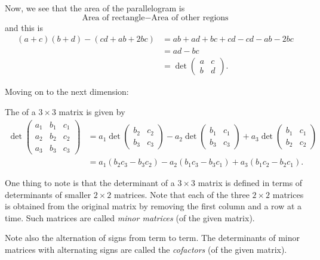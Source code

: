 \documentclass{ximera}
\begin{document}
Now, we see that the area of the parallelogram is
\[
\text{Area of rectangle} - \text{Area of other regions}
\]
and this is
\begin{align*}
  (a+c)(b+d) - \left(cd + ab + 2bc \right)&= ab + ad + bc + cd - cd - ab-2bc\\
  &=  ad - bc\\
  &= \det
  \begin{pmatrix}
    a & c\\
    b & d
  \end{pmatrix}.
\end{align*}

Moving on to the next dimension:
\begin{definition}
  The  of a $3 \times 3$ matrix is given by
  \begin{align*}
    \det\begin{pmatrix}
      a_1 &  b_1 & c_1 \\
      a_2 &  b_2 & c_2 \\
      a_3 &  b_3 & c_3
    \end{pmatrix}
    & =
      a_1 \det
      \begin{pmatrix}
        b_2 & c_2 \\
        b_3 & c_3
      \end{pmatrix}
      - a_2 \det
      \begin{pmatrix}
        b_1 & c_1 \\
        b_3 & c_3
      \end{pmatrix}
      + a_3 \det
      \begin{pmatrix}
        b_1 & c_1 \\
        b_2 & c_2
      \end{pmatrix} \\
          & = a_1(b_2c_3 - b_3c_2) - a_2(b_1c_3 - b_3c_1) + a_3(b_1c_2 - b_2c_1).
  \end{align*}
\end{definition}

One thing to note is that the determinant of a $3 \times 3$ matrix is
defined in terms of determinants of smaller $2 \times 2$ matrices. Note
that each of the three $2 \times 2$ matrices is obtained from the original
matrix by removing the first column and a row at a time. Such matrices
are called \textit{minor matrices} (of the given matrix).

Note also the alternation of signs from term to term. The determinants
of minor matrices with alternating signs are called the \textit{cofactors} (of
the given matrix).
\end{document}
